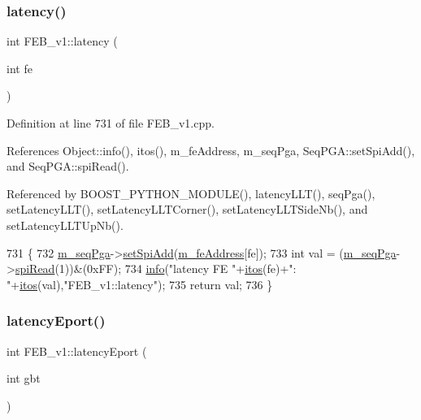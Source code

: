 \subsubsection{\texorpdfstring{latency()}{latency()}}
{\footnotesize\ttfamily int F\+E\+B\+\_\+v1\+::latency (\begin{DoxyParamCaption}\item[{int}]{fe }\end{DoxyParamCaption})}



Definition at line 731 of file F\+E\+B\+\_\+v1.\+cpp.



References Object\+::info(), itos(), m\+\_\+fe\+Address, m\+\_\+seq\+Pga, Seq\+P\+G\+A\+::set\+Spi\+Add(), and Seq\+P\+G\+A\+::spi\+Read().



Referenced by B\+O\+O\+S\+T\+\_\+\+P\+Y\+T\+H\+O\+N\+\_\+\+M\+O\+D\+U\+L\+E(), latency\+L\+L\+T(), seq\+Pga(), set\+Latency\+L\+L\+T(), set\+Latency\+L\+L\+T\+Corner(), set\+Latency\+L\+L\+T\+Side\+Nb(), and set\+Latency\+L\+L\+T\+Up\+Nb().


\begin{DoxyCode}
731                            \{
732   \hyperlink{classFEB__v1_a6c7804ac86796f233a8393043adf2e77}{m\_seqPga}->\hyperlink{classSeqPGA_ac998ce3a6d9b5f2e88cc8393f8c1df53}{setSpiAdd}(\hyperlink{classFEB__v1_a4e1945c2d5b434125f375e9d0fc6d99f}{m\_feAddress}[fe]);
733   \textcolor{keywordtype}{int} val = (\hyperlink{classFEB__v1_a6c7804ac86796f233a8393043adf2e77}{m\_seqPga}->\hyperlink{classSeqPGA_ab3d0e5e5d4014bc7a92588a76b8713d4}{spiRead}(1))&(0xFF);
734   \hyperlink{classObject_a644fd329ea4cb85f54fa6846484b84a8}{info}(\textcolor{stringliteral}{"latency FE "}+\hyperlink{Tools_8h_af330027dbdafb9a30768b3613c553e60}{itos}(fe)+\textcolor{stringliteral}{": "}+\hyperlink{Tools_8h_af330027dbdafb9a30768b3613c553e60}{itos}(val),\textcolor{stringliteral}{"FEB\_v1::latency"});
735   \textcolor{keywordflow}{return} val;
736 \}
\end{DoxyCode}
\mbox{\label{classFEB__v1_a330c0a895c3c43acda2fd68e1cdb7368}} 
\subsubsection{\texorpdfstring{latency\+Eport()}{latencyEport()}\hspace{0.1cm}{\footnotesize\ttfamily [1/2]}}
{\footnotesize\ttfamily int F\+E\+B\+\_\+v1\+::latency\+Eport (\begin{DoxyParamCaption}\item[{int}]{gbt }\end{DoxyParamCaption})}



